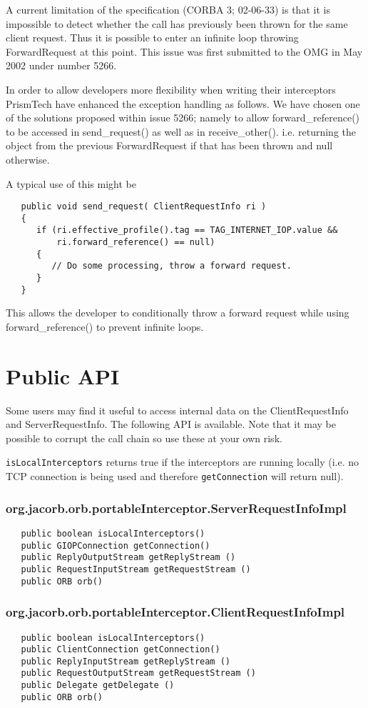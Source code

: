 A current limitation of the specification (CORBA 3; 02-06-33) is that it is
impossible to detect whether the call has previously been thrown for the same
client request. Thus it is possible to enter an infinite loop throwing
ForwardRequest at this point. This issue was first submitted to the OMG in
May 2002 under number 5266.

In order to allow developers more flexibility when writing their interceptors
PrismTech have enhanced the exception handling as follows. We have chosen one of
the solutions proposed within issue 5266; namely to allow forward\_reference()
to be accessed in send\_request() as well as in receive\_other(). i.e. returning
the object from the previous ForwardRequest if that has been thrown and null
otherwise.

A typical use of this might be
\begin{verbatim}
   public void send_request( ClientRequestInfo ri )
   {
      if (ri.effective_profile().tag == TAG_INTERNET_IOP.value &&
          ri.forward_reference() == null)
      {
         // Do some processing, throw a forward request.
      }
   }
\end{verbatim}
This allows the developer to conditionally throw a forward request while using
forward\_reference() to prevent infinite loops.

\section{Public API}
Some users may find it useful to access internal data on the ClientRequestInfo and ServerRequestInfo. The following API is available. Note that it may be possible to corrupt the call chain so use these at your own risk.

{\tt isLocalInterceptors} returns true if the interceptors are running locally (i.e. no TCP
connection is being used and therefore {\tt getConnection} will return null).

\subsubsection{org.jacorb.orb.portableInterceptor.ServerRequestInfoImpl}
\begin{verbatim}
   public boolean isLocalInterceptors()
   public GIOPConnection getConnection()
   public ReplyOutputStream getReplyStream ()
   public RequestInputStream getRequestStream ()
   public ORB orb()
\end{verbatim}

\subsubsection{org.jacorb.orb.portableInterceptor.ClientRequestInfoImpl}
\begin{verbatim}
   public boolean isLocalInterceptors()
   public ClientConnection getConnection()
   public ReplyInputStream getReplyStream ()
   public RequestOutputStream getRequestStream ()
   public Delegate getDelegate ()
   public ORB orb()
\end{verbatim}


